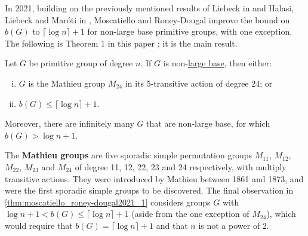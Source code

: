 In 2021, building on the previously mentioned results of Liebeck in \cite{liebeck1984} and Halasi, Liebeck and Mar\'oti in \cite{halasi2019}, Moscatiello and Roney-Dougal improve the bound on $b(G)$ to $\lceil\log n\rceil + 1$ for non-large base primitive groups, with one exception. The following is Theorem 1 in this paper \cite{moscatiello_roney-dougal2021}; it is the main result.

\begin{theorem}\label{thm:moscatiello_roney-dougal2021_1}
    Let $G$ be primitive group of degree $n$. If $G$ is non-\hyperref[def:large_base]{large base}, then either:
    \begin{enumerate}[(i)]
        \item $G$ is the Mathieu group $M_{24}$ in its 5-transitive action of degree 24; or
        \item $b(G) \leq \lceil\log n\rceil + 1$.
    \end{enumerate}
    Moreover, there are infinitely many $G$ that are non-large base, for which $b(G) > \log n + 1$.
\end{theorem}

The \textbf{Mathieu groups} are five sporadic simple permutation groups $M_{11}$, $M_{12}$, $M_{22}$, $M_{23}$ and $M_{24}$ of degree 11, 12, 22, 23 and 24 respectively, with multiply transitive actions. They were introduced by Mathieu between 1861 and 1873, and were the first sporadic simple groups to be discovered. The final observation in \autoref{thm:moscatiello_roney-dougal2021_1} considers groups $G$ with $\log n + 1 < b(G) \leq \lceil\log n\rceil + 1$ (aside from the one exception of $M_{24}$), which would require that $b(G) = \lceil\log n\rceil + 1$ and that $n$ is not a power of 2.

